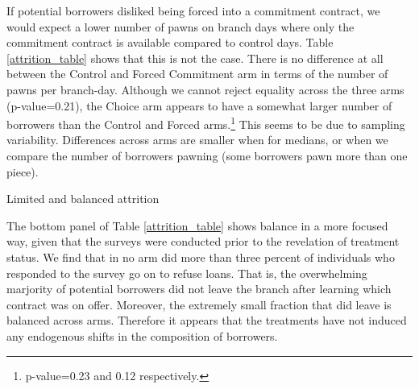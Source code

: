 \begin{appendix}
If potential borrowers disliked being forced into a commitment contract, we would expect a lower number of pawns on branch days where only the commitment contract is available compared to control days. Table \ref{attrition_table} shows that this is not the case. There is no difference at all between the Control and Forced Commitment arm in terms of the number of pawns per branch-day. Although we cannot reject equality across the three arms (p-value=0.21), the Choice arm appears to have a somewhat larger number of borrowers than the Control and Forced arms.\footnote{p-value=0.23 and 0.12 respectively.} This seems to be due to sampling variability. Differences across arms are smaller when for medians, or when we compare the number of borrowers pawning (some borrowers pawn more than one piece). 

\begin{table}
\caption{Limited and balanced attrition}
\label{attrition_table}
\begin{center}
\scriptsize{}
\end{center}
\end{table}


The bottom panel of Table \ref{attrition_table} shows balance in a more focused way, given that the surveys were conducted prior to the revelation of treatment status. We find that in no arm did more than three percent of individuals who responded to the survey go on to refuse loans. That is, the overwhelming marjority of potential borrowers did not leave the branch after learning which contract was on offer. Moreover, the extremely small fraction that did leave is balanced across arms.  Therefore it appears that the treatments have not induced any endogenous shifts in the composition of borrowers. 


\end{appendix}
